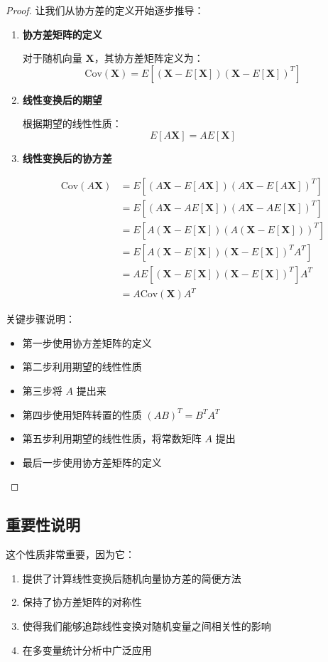 \documentclass[UTF8]{report}
\theoremstyle{MyLineTheoremStyle} %
\theoremstyle{MyBlockTheoremStyle} %
\theoremstyle{MySubsubsectionStyle} %
\begin{document}
\begin{proof}
让我们从协方差的定义开始逐步推导：

\begin{enumerate}
    \item \textbf{协方差矩阵的定义}
    
    对于随机向量 $\mathbf{X}$，其协方差矩阵定义为：
    $$\text{Cov}(\mathbf{X}) = E[(\mathbf{X}-E[\mathbf{X}])(\mathbf{X}-E[\mathbf{X}])^T]$$
    
    \item \textbf{线性变换后的期望}
    
    根据期望的线性性质：
    $$E[A\mathbf{X}] = AE[\mathbf{X}]$$
    
    \item \textbf{线性变换后的协方差}
    
    \begin{align*}
    \text{Cov}(A\mathbf{X}) &= E[(A\mathbf{X}-E[A\mathbf{X}])(A\mathbf{X}-E[A\mathbf{X}])^T] \\
    &= E[(A\mathbf{X}-AE[\mathbf{X}])(A\mathbf{X}-AE[\mathbf{X}])^T] \\
    &= E[A(\mathbf{X}-E[\mathbf{X}])(A(\mathbf{X}-E[\mathbf{X}]))^T] \\
    &= E[A(\mathbf{X}-E[\mathbf{X}])(\mathbf{X}-E[\mathbf{X}])^TA^T] \\
    &= AE[(\mathbf{X}-E[\mathbf{X}])(\mathbf{X}-E[\mathbf{X}])^T]A^T \\
    &= A\text{Cov}(\mathbf{X})A^T
    \end{align*}
\end{enumerate}

关键步骤说明：
\begin{itemize}
    \item 第一步使用协方差矩阵的定义
    \item 第二步利用期望的线性性质
    \item 第三步将 $A$ 提出来
    \item 第四步使用矩阵转置的性质 $(AB)^T = B^TA^T$
    \item 第五步利用期望的线性性质，将常数矩阵 $A$ 提出
    \item 最后一步使用协方差矩阵的定义
\end{itemize}
\end{proof}

\subsection*{重要性说明}
这个性质非常重要，因为它：
\begin{enumerate}
    \item 提供了计算线性变换后随机向量协方差的简便方法
    \item 保持了协方差矩阵的对称性
    \item 使得我们能够追踪线性变换对随机变量之间相关性的影响
    \item 在多变量统计分析中广泛应用
\end{enumerate}
\end{document}
